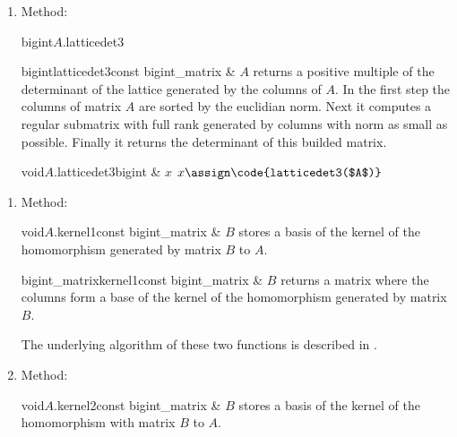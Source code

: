 {\begin{enumerate}
  \begin{cfcode}{void}{$A$.latticedet2}{bigint & $x$}
    $x \assign \code{latticedet2($A$)}$
  \end{cfcode}
\item Method:

  \begin{cfcode}{bigint}{$A$.latticedet3}{}
  \end{cfcode}

  \begin{fcode}{bigint}{latticedet3}{const bigint_matrix & $A$}
    returns a positive multiple of the determinant of the lattice generated by the columns of
    $A$.  In the first step the columns of matrix $A$ are sorted by the euclidian norm.  Next it
    computes a regular submatrix with full rank generated by columns with norm as small as
    possible.  Finally it returns the determinant of this builded matrix.
  \end{fcode}

  \begin{cfcode}{void}{$A$.latticedet3}{bigint & $x$}
    $x \assign \code{latticedet3($A$)}$
  \end{cfcode}
\end{enumerate}




\begin{enumerate}
\item Method:

  \begin{fcode}{void}{$A$.kernel1}{const bigint_matrix & $B$}
    stores a basis of the kernel of the homomorphism generated by matrix $B$ to $A$.
  \end{fcode}
  
  \begin{fcode}{bigint_matrix}{kernel1}{const bigint_matrix & $B$}
    returns a matrix where the columns form a base of the kernel of the homomorphism generated
    by matrix $B$.
  \end{fcode}
  The underlying algorithm of these two functions is described in \cite{Mueller_Thesis:1994}.

\item Method:

  \begin{fcode}{void}{$A$.kernel2}{const bigint_matrix & $B$}
    stores a basis of the kernel of the homomorphism with matrix $B$ to $A$.
  \end{fcode}


\end{enumerate}}
